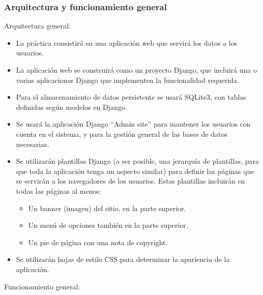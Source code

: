 \subsubsection{Arquitectura y funcionamiento general}

Arquitectura general:

\begin{itemize}
\item La práctica consistirá en una aplicación web que servirá los datos a los usuarios.

\item La aplicación web se construirá como un proyecto Django, que incluirá una o varias aplicaciones Django que implementen la funcionalidad requerida.

\item Para el almacenamiento de datos persistente se usará SQLite3, con tablas definidas según modelos en Django.

\item Se usará la aplicación Django ``Admin site'' para mantener los usuarios con cuenta en el sistema, y para la gestión general de las bases de datos necesarias.

\item Se utilizarán plantillas Django (a ser posible, una jerarquía de plantillas, para que toda la aplicación tenga un aspecto similar) para definir las páginas que se servirán a los navegadores de los usuarios. Estas plantillas incluirán en todas las páginas al menos:
  \begin{itemize}
  \item Un banner (imagen) del sitio, en la parte superior.
  \item Un menú de opciones también en la parte superior.
  \item Un pie de página con una nota de copyright.
  \end{itemize}

\item Se utilizarán hojas de estilo CSS para determinar la apariencia de la aplicación.
\end{itemize}

Funcionamiento general:

